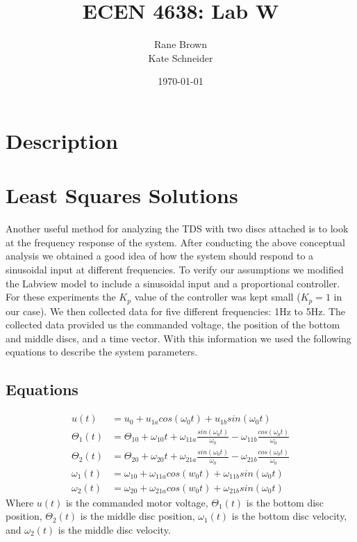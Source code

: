 \documentclass[11pt,titlepage]{article}
\author{Rane Brown \\ Kate Schneider}
\title{ECEN 4638: Lab W}
\date{\today}
\begin{document}
\maketitle
\tableofcontents
\listoffigures
\newpage

\section{Description}


\section{Least Squares Solutions}
	Another useful method for analyzing the TDS with two discs attached is to look at the frequency response of the system. After conducting the above conceptual analysis we obtained a good idea of how the system should respond to a sinusoidal input at different frequencies. To verify our assumptions we modified the Labview model to include a sinusoidal input and a proportional controller. For these experiments the $K_p$ value of the controller was kept small ($K_p = 1$ in our case). We then collected data for five different frequencies: 1Hz to 5Hz. The collected data provided us the commanded voltage, the position of the bottom and middle discs, and a time vector. With this information we used the following equations to describe the system parameters.
	\subsection{Equations} \label{sec:eq}
		\begin{align}
			u(t) &= u_0 + u_{1a}cos(\omega_0t) + u_{1b}sin(\omega_0t) \\[1em]
			\Theta_1(t) &= \Theta_{10} + \omega_{10}t + \omega_{11a}\frac{sin(\omega_0t)}{\omega_0} - \omega_{11b}\frac{cos(\omega_0t)}{\omega_0} \\[1em]
			\Theta_2(t) &= \Theta_{20} + \omega_{20}t + \omega_{21a}\frac{sin(\omega_0t)}{\omega_0} - \omega_{21b}\frac{cos(\omega_0t)}{\omega_0} \\[1em]
			\omega_1(t) &= \omega_{10} + \omega_{11a}cos(w_0t) + \omega_{11b}sin(\omega_0t) \\[1em]
			\omega_2(t) &= \omega_{20} + \omega_{21a}cos(w_0t) + \omega_{21b}sin(\omega_0t)
		\end{align}
		Where $u(t)$ is the commanded motor voltage, $\Theta_1(t)$ is the bottom disc position, $\Theta_2(t)$ is the middle disc position, $\omega_1(t)$ is the bottom disc velocity, and $\omega_2(t)$ is the middle disc velocity.
\end{document}
